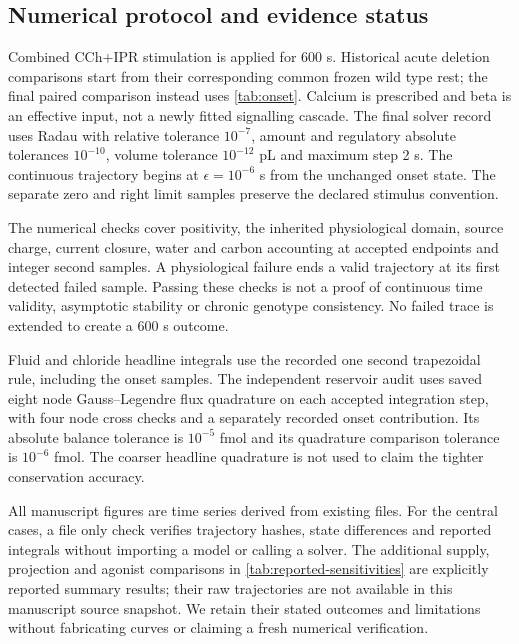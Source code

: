 \subsection{Numerical protocol and evidence status}
\label{sec:numerics}

Combined CCh+IPR stimulation is applied for 600 s. Historical acute deletion comparisons start from their corresponding common frozen wild type rest; the final paired comparison instead uses \cref{tab:onset}. Calcium is prescribed and beta is an effective input, not a newly fitted signalling cascade. The final solver record uses Radau with relative tolerance $10^{-7}$, amount and regulatory absolute tolerances $10^{-10}$, volume tolerance $10^{-12}$ pL and maximum step 2 s. The continuous trajectory begins at $\epsilon=10^{-6}$ s from the unchanged onset state. The separate zero and right limit samples preserve the declared stimulus convention.

The numerical checks cover positivity, the inherited physiological domain, source charge, current closure, water and carbon accounting at accepted endpoints and integer second samples. A physiological failure ends a valid trajectory at its first detected failed sample. Passing these checks is not a proof of continuous time validity, asymptotic stability or chronic genotype consistency. No failed trace is extended to create a 600 s outcome.

Fluid and chloride headline integrals use the recorded one second trapezoidal rule, including the onset samples. The independent reservoir audit uses saved eight node Gauss--Legendre flux quadrature on each accepted integration step, with four node cross checks and a separately recorded onset contribution. Its absolute balance tolerance is $10^{-5}$ fmol and its quadrature comparison tolerance is $10^{-6}$ fmol. The coarser headline quadrature is not used to claim the tighter conservation accuracy.

All manuscript figures are time series derived from existing files. For the central cases, a file only check verifies trajectory hashes, state differences and reported integrals without importing a model or calling a solver. The additional supply, projection and agonist comparisons in \cref{tab:reported-sensitivities} are explicitly reported summary results; their raw trajectories are not available in this manuscript source snapshot. We retain their stated outcomes and limitations without fabricating curves or claiming a fresh numerical verification.
